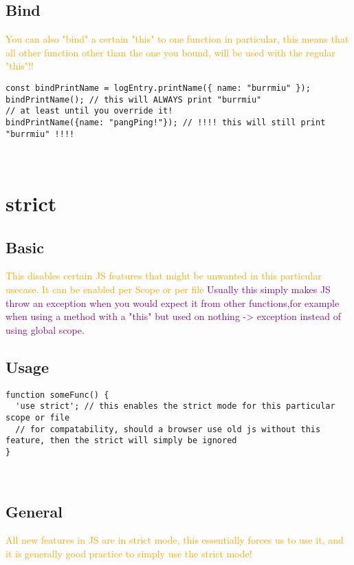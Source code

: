 \documentclass[main.tex,fontsize=6pt,paper=a4,paper=landscape,DIV=calc,]{scrartcl}
\begin{document}
\begin{multicols*}{4}
\subsection{Bind}  
\textcolor{orange}{You can also "bind" a certain "this" to one function in particular, this means that all other function other than the one you bound, will be used with the regular "this"!!}\newline
\begin{lstlisting}
const bindPrintName = logEntry.printName({ name: "burrmiu" });
bindPrintName(); // this will ALWAYS print "burrmiu"
// at least until you override it!
bindPrintName({name: "pangPing!"}); // !!!! this will still print "burrmiu" !!!!
\end{lstlisting}
\, \newline


\section{strict}


\subsection{Basic} 
\textcolor{orange}{This disables certain JS features that might be unwanted in this particular usecase. \newline
It can be enabled per Scope or per file}\newline
\textcolor{purple}{Usually this simply makes JS throw an exception when you would expect it from other functions,for example when using a method with a "this" but used on nothing -> exception instead of using global scope.}

\subsection{Usage}  
\begin{lstlisting}
function someFunc() {
  'use strict'; // this enables the strict mode for this particular scope or file
  // for compatability, should a browser use old js without this feature, then the strict will simply be ignored
}
\end{lstlisting}
\, \newline

\subsection{General}  
\textcolor{orange}{All new features in JS are in strict mode, this essentially forces us to use it, and it is generally good practice to simply use the strict mode!}


\end{multicols*}
\end{document}
